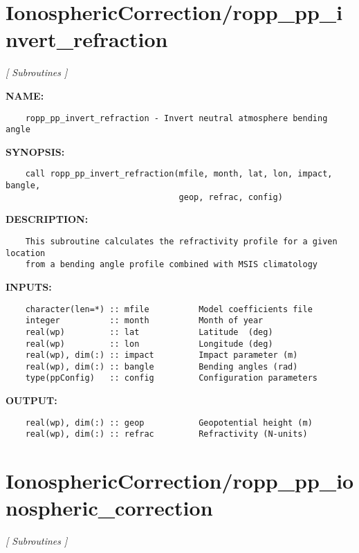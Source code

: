 \section{IonosphericCorrection/ropp\_pp\_invert\_refraction}
\textsl{[ Subroutines ]}

\label{ch:robo27}
\label{ch:IonosphericCorrection_ropp_pp_invert_refraction}
\textbf{NAME:}\hspace{0.08in}\begin{Verbatim}
    ropp_pp_invert_refraction - Invert neutral atmosphere bending angle
\end{Verbatim}
\textbf{SYNOPSIS:}\hspace{0.08in}\begin{Verbatim}
    call ropp_pp_invert_refraction(mfile, month, lat, lon, impact, bangle,
                                   geop, refrac, config)
\end{Verbatim}
\textbf{DESCRIPTION:}\hspace{0.08in}\begin{Verbatim}
    This subroutine calculates the refractivity profile for a given location
    from a bending angle profile combined with MSIS climatology
\end{Verbatim}
\textbf{INPUTS:}\hspace{0.08in}\begin{Verbatim}
    character(len=*) :: mfile          Model coefficients file
    integer          :: month          Month of year  
    real(wp)         :: lat            Latitude  (deg)
    real(wp)         :: lon            Longitude (deg)
    real(wp), dim(:) :: impact         Impact parameter (m)
    real(wp), dim(:) :: bangle         Bending angles (rad)
    type(ppConfig)   :: config         Configuration parameters
\end{Verbatim}
\textbf{OUTPUT:}\hspace{0.08in}\begin{Verbatim}
    real(wp), dim(:) :: geop           Geopotential height (m)
    real(wp), dim(:) :: refrac         Refractivity (N-units)
\end{Verbatim}
\section{IonosphericCorrection/ropp\_pp\_ionospheric\_correction}
\textsl{[ Subroutines ]}

